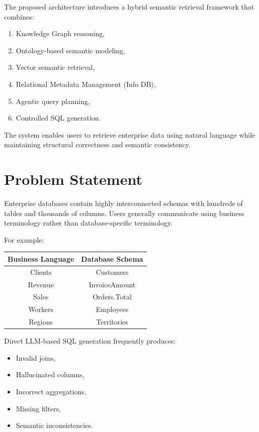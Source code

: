 \documentclass[11pt,a4paper]{article}
\begin{document}
The proposed architecture introduces a hybrid semantic retrieval framework that combines:
\begin{enumerate}
    \item Knowledge Graph reasoning,
    \item Ontology-based semantic modeling,
    \item Vector semantic retrieval,
    \item Relational Metadata Management (Info DB),
    \item Agentic query planning,
    \item Controlled SQL generation.
\end{enumerate}

The system enables users to retrieve enterprise data using natural language while maintaining structural correctness and semantic consistency.

\section{Problem Statement}

Enterprise databases contain highly interconnected schemas with hundreds of tables and thousands of columns. Users generally communicate using business terminology rather than database-specific terminology.

For example:

\begin{center}
\begin{tabular}{|c|c|}
\hline
Business Language & Database Schema \\
\hline
Clients & Customers \\
Revenue & InvoiceAmount \\
Sales & Orders.Total \\
Workers & Employees \\
Regions & Territories \\
\hline
\end{tabular}
\end{center}

Direct LLM-based SQL generation frequently produces:
\begin{itemize}
    \item Invalid joins,
    \item Hallucinated columns,
    \item Incorrect aggregations,
    \item Missing filters,
    \item Semantic inconsistencies.
\end{itemize}
\end{document}
